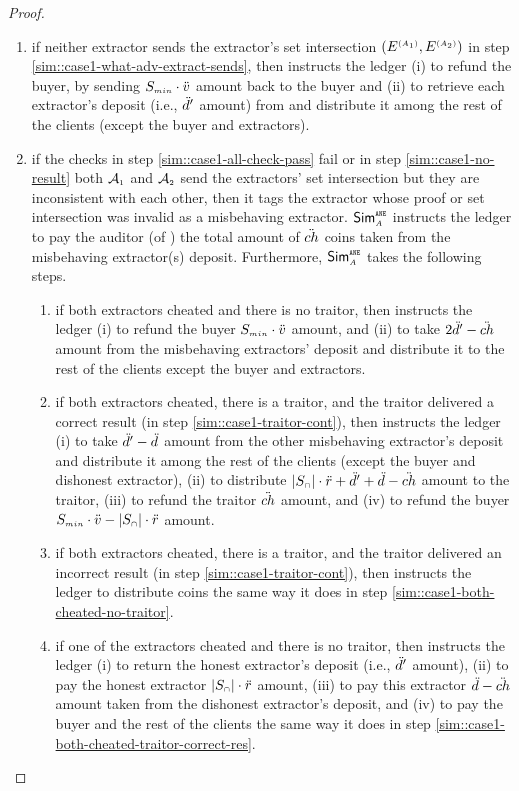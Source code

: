 \begin{proof}
\begin{enumerate}
%
\item \label{sim::case1-no-result} if neither extractor sends the extractor's set intersection $(E^{\scriptscriptstyle (A_{\scriptscriptstyle 1})}, E^{\scriptscriptstyle (A_{\scriptscriptstyle 2})})$  in step \ref{sim::case1-what-adv-extract-sends}, then instructs the ledger  (i) to refund the buyer, by sending $S_{\scriptscriptstyle min}\cdot \ddot{v}$ amount back to the buyer and (ii) to
 retrieve each extractor's deposit (i.e., $\ddot{d}'$ amount) from \SCpc and distribute it among the rest of the clients (except the buyer and extractors).  
%
\item if the checks in step \ref{sim::case1-all-check-pass} fail or in step  \ref{sim::case1-no-result} both $\mathcal{A}_{\scriptscriptstyle 1}$  and $\mathcal{A}_{\scriptscriptstyle 2}$ send the extractors' set intersection but they are inconsistent with each other, then it tags the extractor whose proof or set intersection was invalid as a misbehaving extractor. $\mathsf{Sim}^{\scriptscriptstyle \mathtt{ANE}}_{\scriptscriptstyle A}$ instructs the ledger to pay the auditor (of \SCpc) the total amount of $\ddot{ch}$ coins taken from the misbehaving extractor(s) deposit. Furthermore, $\mathsf{Sim}^{\scriptscriptstyle \mathtt{ANE}}_{\scriptscriptstyle A}$ takes the following steps. 
%
\begin{enumerate}
\item\label{sim::case1-both-cheated-no-traitor} if both extractors cheated and there is no traitor, then instructs the ledger (i) to refund the buyer $S_{\scriptscriptstyle min}\cdot \ddot{v}$ amount, and (ii) to take $2 \ddot{d}'-\ddot{ch}$ amount from the misbehaving extractors'  deposit and distribute it to the rest of the clients except the buyer and extractors. 
%
\item\label{sim::case1-both-cheated-traitor-correct-res} if both extractors cheated, there is a traitor, and the traitor delivered a correct result (in step \ref{sim::case1-traitor-cont}), then instructs the ledger (i) to take $\ddot{d}'-\ddot{d}$ amount from the other misbehaving extractor's deposit and distribute it among the rest of the clients (except the buyer and dishonest extractor), (ii) to distribute $|S_{\scriptscriptstyle\cap}|\cdot \ddot{r}+\ddot{d}'+\ddot{d}-\ddot{ch}$ amount to the traitor, (iii) to refund the traitor  $\ddot{ch}$ amount, and (iv) to refund the buyer $S_{\scriptscriptstyle min}\cdot \ddot{v}-|S_{\scriptscriptstyle\cap}|\cdot \ddot{r}$ amount. 
%
\item if both extractors cheated, there is a traitor, and the traitor delivered an incorrect result (in step \ref{sim::case1-traitor-cont}), then instructs the ledger to distribute coins the same way it does in step \ref{sim::case1-both-cheated-no-traitor}. 
%
\item if one of the extractors cheated and there is no traitor, then instructs the ledger (i) to return the honest extractor’s deposit (i.e., $\ddot{d}'$ amount), (ii) to pay the honest extractor $|S_{\scriptscriptstyle\cap}|\cdot \ddot{r}$ amount,  (iii)  to pay this extractor $ \ddot{d}-\ddot{ch}$ amount taken from the dishonest extractor's deposit, and (iv) to pay the buyer and the rest of the clients the same way it does in step \ref{sim::case1-both-cheated-traitor-correct-res}. 

\end{enumerate}
\end{enumerate}
\end{proof}
